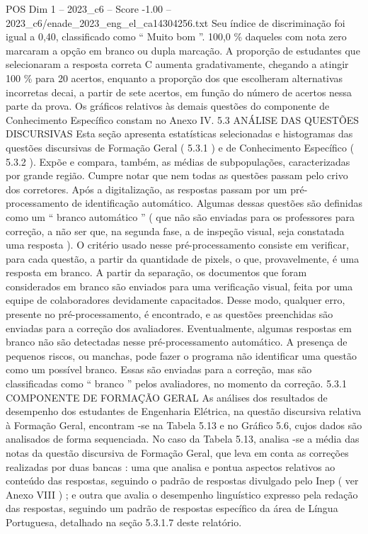 \begin{textsample}{POS Dim 1 – 2023\_c6 – Score -1.00 – 2023\_c6/enade\_2023\_eng\_el\_ca14304256.txt}
Seu índice de discriminação foi igual a 0,40, classificado como “ Muito bom ”. 100,0 \% daqueles com nota zero marcaram a opção em branco ou dupla marcação.
A proporção de estudantes que selecionaram a resposta correta C aumenta gradativamente, chegando a atingir 100 \% para 20 acertos, enquanto a proporção dos que escolheram alternativas incorretas decai, a partir de sete acertos, em função do número de acertos nessa parte da prova.
Os gráficos relativos às demais questões do componente de Conhecimento Específico constam no Anexo IV. 5.3 ANÁLISE DAS QUESTÕES DISCURSIVAS Esta seção apresenta estatísticas selecionadas e histogramas das questões discursivas de Formação Geral ( 5.3.1 ) e de Conhecimento Específico ( 5.3.2 ).
Expõe e compara, também, as médias de subpopulações, caracterizadas por grande região.
Cumpre notar que nem todas as questões passam pelo crivo dos corretores.
Após a digitalização, as respostas passam por um pré-processamento de identificação automático.
Algumas dessas questões são definidas como um “ branco automático ” ( que não são enviadas para os professores para correção, a não ser que, na segunda fase, a de inspeção visual, seja constatada uma resposta ).
O critério usado nesse pré-processamento consiste em verificar, para cada questão, a partir da quantidade de pixels, o que, provavelmente, é uma resposta em branco.
A partir da separação, os documentos que foram considerados em branco são enviados para uma verificação visual, feita por uma equipe de colaboradores devidamente capacitados.
Desse modo, qualquer erro, presente no pré-processamento, é encontrado, e as questões preenchidas são enviadas para a correção dos avaliadores.
Eventualmente, algumas respostas em branco não são detectadas nesse pré-processamento automático.
A presença de pequenos riscos, ou manchas, pode fazer o programa não identificar uma questão como um possível branco.
Essas são enviadas para a correção, mas são classificadas como “ branco ” pelos avaliadores, no momento da correção. 5.3.1 COMPONENTE DE FORMAÇÃO GERAL As análises dos resultados de desempenho dos estudantes de Engenharia Elétrica, na questão discursiva relativa à Formação Geral, encontram -se na Tabela 5.13 e no Gráfico 5.6, cujos dados são analisados de forma sequenciada.
No caso da Tabela 5.13, analisa -se a média das notas da questão discursiva de Formação Geral, que leva em conta as correções realizadas por duas bancas : uma que analisa e pontua aspectos relativos ao conteúdo das respostas, seguindo o padrão de respostas divulgado pelo Inep ( ver Anexo VIII ) ; e outra que avalia o desempenho linguístico expresso pela redação das respostas, seguindo um padrão de respostas específico da área de Língua Portuguesa, detalhado na seção 5.3.1.7 deste relatório.

\end{textsample}
